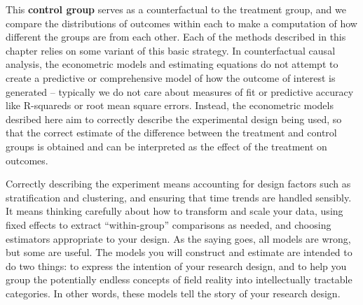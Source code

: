 This \textbf{control group} serves as a counterfactual to the treatment group,
and we compare the distributions of outcomes within each
to make a computation of how different the groups are from each other.
Each of the methods described in this chapter
relies on some variant of this basic strategy.
In counterfactual causal analysis,
the econometric models and estimating equations
do not attempt to create a predictive or comprehensive model
of how the outcome of interest is generated --
typically we do not care about measures of fit or predictive accuracy
like R-squareds or root mean square errors.
Instead, the econometric models desribed here aim to
correctly describe the experimental design being used,
so that the correct estimate of the difference
between the treatment and control groups is obtained
and can be interpreted as the effect of the treatment on outcomes.

Correctly describing the experiment means accounting for design factors
such as stratification and clustering, and
ensuring that time trends are handled sensibly.
It means thinking carefully about how to transform and scale your data,
using fixed effects to extract ``within-group'' comparisons as needed,
and choosing estimators appropriate to your design.
As the saying goes, all models are wrong, but some are useful.
The models you will construct and estimate are intended to do two things:
to express the intention of your research design,
and to help you group the potentially endless concepts of field reality
into intellectually tractable categories.
In other words, these models tell the story of your research design.

